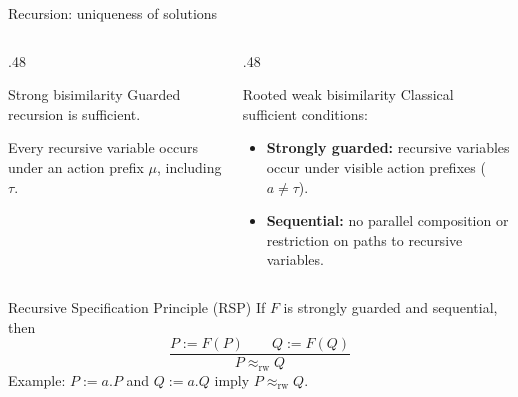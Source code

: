 \documentclass[handout,aspectratio=169,11pt]{beamer}
\begin{document}
\begin{frame}{Recursion: uniqueness of solutions}
  \footnotesize

  \begin{columns}[T,onlytextwidth]
    \begin{column}{.48\textwidth}
      \begin{block}{Strong bisimilarity}
        Guarded recursion is sufficient.

        Every recursive variable occurs under
        an action prefix $\mu$, including $\tau$.
      \end{block}
    \end{column}

    \begin{column}{.48\textwidth}
      \begin{block}{Rooted weak bisimilarity}
        Classical sufficient conditions:
        \begin{itemize}
          \item \textbf{Strongly guarded:}
            recursive variables occur under
            visible action prefixes ($a\neq\tau$).
          \item \textbf{Sequential:}
            no parallel composition or restriction
            on paths to recursive variables.
        \end{itemize}
      \end{block}
    \end{column}
  \end{columns}

  \begin{block}{Recursive Specification Principle (RSP)}
    If $F$ is strongly guarded and sequential, then
    \[
      \boxed{
        \frac{
          P := F(P)
          \qquad
          Q := F(Q)
        }{
          P \approx_{\mathrm{rw}} Q
        }
      }
    \]
    Example: $P := a.P$ and
    $Q := a.Q$
    imply $P \approx_{\mathrm{rw}} Q$.
  \end{block}



\end{frame}
\end{document}
